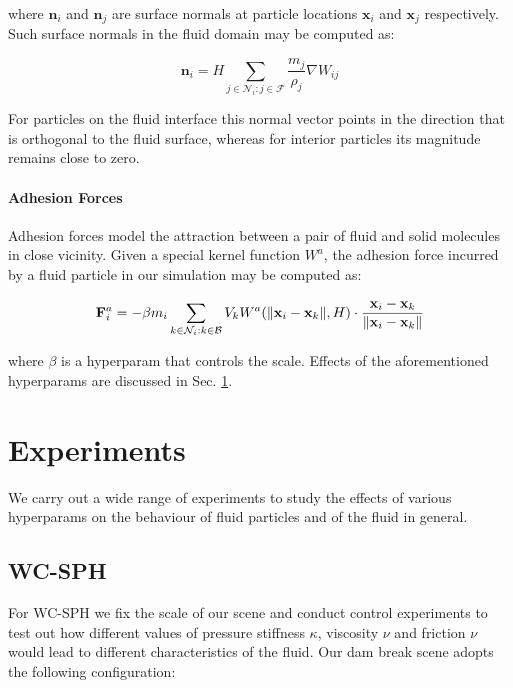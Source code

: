 \documentclass[
	11pt, 
	DIV10,
	ngerman,
	a4paper, 
	oneside, 
	headings=normal, 
	captions=tableheading,
	final, 
	numbers=noenddot
]{scrartcl}
\DeclarePairedDelimiter{\norm}{\lVert}{\rVert}
\begin{document}
where $ \mathbf{n}_{i} $ and $ \mathbf{n}_{j} $ are surface normals at particle locations $ \mathbf{x}_{i} $ and $ \mathbf{x}_{j} $ respectively. Such surface normals in the fluid domain may be computed as:

\begin{equation}
	\label{eq27}
	\mathbf{n}_{i} = H \sum_{j \in \mathcal{N}_{i}:j \in \mathcal{F}} \frac{m_{j}}{\rho_{j}} \nabla W_{ij}
\end{equation}

For particles on the fluid interface this normal vector points in the direction that is orthogonal to the fluid surface, whereas for interior particles its magnitude remains close to zero.

\paragraph{Adhesion Forces}

Adhesion forces model the attraction between a pair of fluid and solid molecules in close vicinity. Given a special kernel function $ W^{a} $, the adhesion force incurred by a fluid particle in our simulation may be computed as:

\begin{equation}
	\label{28}
	\mathbf{F}_{i}^{a} = - \beta m_{i} \sum_{k \in \mathcal{N}_{i}:k \in \mathcal{B}} V_{k} W^{a}(\norm{\mathbf{x}_{i} - \mathbf{x}_{k}}, H) \cdot \frac{\mathbf{x}_{i} - \mathbf{x}_{k}}{\norm{\mathbf{x}_{i} - \mathbf{x}_{k}}}
\end{equation}

where $ \beta $ is a hyperparam that controls the scale. Effects of the aforementioned hyperparams are discussed in Sec. \ref{sec4}.

\section{Experiments}
\label{sec4}

We carry out a wide range of experiments to study the effects of various hyperparams on the behaviour of fluid particles and of the fluid in general.

\subsection{WC-SPH}
For WC-SPH we fix the scale of our scene and conduct control experiments to test out how different values of pressure stiffness $ \kappa $, viscosity $ \nu $ and friction $ \nu$ would lead to different characteristics of the fluid. Our dam break scene adopts the following configuration:
\end{document}
